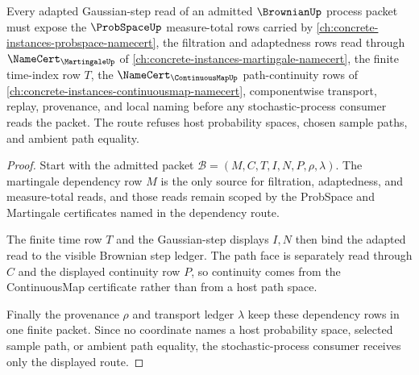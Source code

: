 \begin{theorem}
\label{thm:brownian-probspace-martingale-dependency-route}
Every adapted Gaussian-step read of an admitted $\BrownianUp$ process packet must expose the $\ProbSpaceUp$ measure-total rows carried by \autoref{ch:concrete-instances-probspace-namecert}, the filtration and adaptedness rows read through $\NameCert_{\MartingaleUp}$ of \autoref{ch:concrete-instances-martingale-namecert}, the finite time-index row $T$, the $\NameCert_{\ContinuousMapUp}$ path-continuity rows of \autoref{ch:concrete-instances-continuousmap-namecert}, componentwise transport, replay, provenance, and local naming before any stochastic-process consumer reads the packet. The route refuses host probability spaces, chosen sample paths, and ambient path equality.
\end{theorem}
\begin{proof}
Start with the admitted packet $\mathcal{B}=(M,C,T,I,N,P,\rho,\lambda)$. The martingale dependency row $M$ is the only source for filtration, adaptedness, and measure-total reads, and those reads remain scoped by the ProbSpace and Martingale certificates named in the dependency route.

The finite time row $T$ and the Gaussian-step displays $I,N$ then bind the adapted read to the visible Brownian step ledger. The path face is separately read through $C$ and the displayed continuity row $P$, so continuity comes from the ContinuousMap certificate rather than from a host path space.

Finally the provenance $\rho$ and transport ledger $\lambda$ keep these dependency rows in one finite packet. Since no coordinate names a host probability space, selected sample path, or ambient path equality, the stochastic-process consumer receives only the displayed route.
\end{proof}

